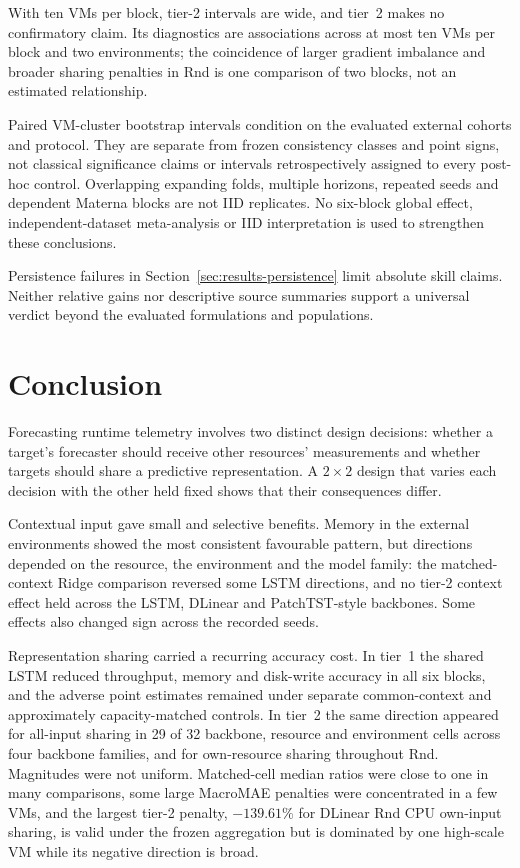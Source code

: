 \documentclass[a4paper,fleqn]{cas-dc}
\begin{document}
With ten VMs per block, tier-2 intervals are wide, and tier~2 makes no
confirmatory claim. Its diagnostics are associations across at most ten VMs
per block and two environments; the coincidence of larger gradient
imbalance and broader sharing penalties in Rnd is one comparison of two
blocks, not an estimated relationship.

Paired VM-cluster bootstrap intervals condition on the evaluated external
cohorts and protocol. They are separate from frozen consistency classes and
point signs, not classical significance claims or intervals retrospectively
assigned to every post-hoc control. Overlapping expanding folds, multiple
horizons, repeated seeds and dependent Materna blocks are not IID replicates.
No six-block global effect, independent-dataset meta-analysis or IID
interpretation is used to strengthen these conclusions.

Persistence failures in Section~\ref{sec:results-persistence} limit absolute
skill claims. Neither relative gains nor descriptive source summaries support
a universal verdict beyond the evaluated formulations and populations.

\section{Conclusion}
\label{sec:conclusion}

Forecasting runtime telemetry involves two distinct design decisions: whether
a target's forecaster should receive other resources' measurements and
whether targets should share a predictive representation. A $2\times2$
design that varies each decision with the other held fixed shows that their
consequences differ.

Contextual input gave small and selective benefits. Memory in the external
environments showed the most consistent favourable pattern, but directions
depended on the resource, the environment and the model family: the
matched-context Ridge comparison reversed some LSTM directions, and no
tier-2 context effect held across the LSTM, DLinear and
PatchTST-style backbones. Some effects also changed sign across the recorded seeds.

Representation sharing carried a recurring accuracy cost. In tier~1 the
shared LSTM reduced throughput, memory and disk-write accuracy in all six
blocks, and the adverse point estimates remained under separate
common-context and approximately capacity-matched controls. In tier~2 the
same direction appeared for all-input sharing in 29 of 32 backbone, resource
and environment cells across four backbone families, and for own-resource
sharing throughout Rnd. Magnitudes were not uniform. Matched-cell median
ratios were close to one in many comparisons, some large MacroMAE penalties
were concentrated in a few VMs, and the largest tier-2 penalty, $-139.61\%$
for DLinear Rnd CPU own-input sharing, is valid under the frozen aggregation
but is dominated by one high-scale VM while its negative direction is broad.
\end{document}
